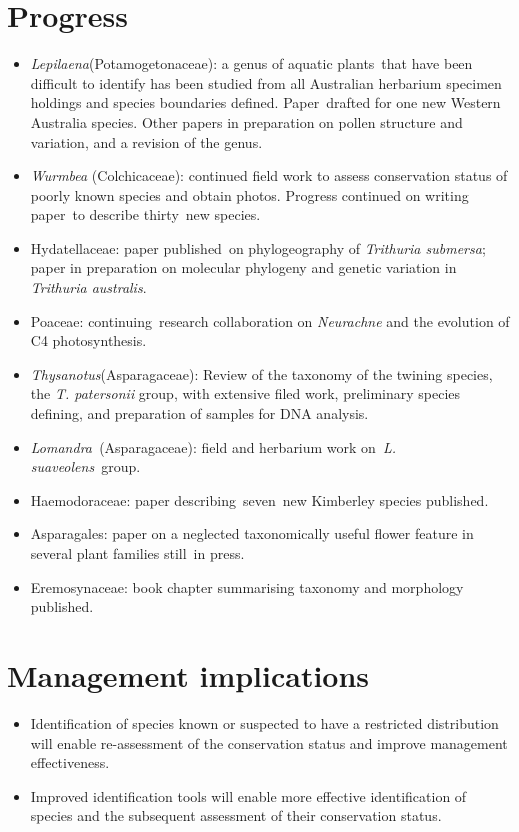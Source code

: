\documentclass[version=last,
    paper=a4, %
    10pt, %
    usenames,
    dvipsnames,
    oneside, %
    headings=openany, %
    DIV=15 %
]{scrbook}
\begin{document}
\section*{Progress}
\begin{itemize}
\itemsep1pt\parskip0pt
\item
  \emph{Lepilaena}(Potamogetonaceae): a genus of aquatic plants~that
  have been difficult to identify has been studied from all Australian
  herbarium specimen holdings and species boundaries defined.
  Paper~drafted for one new Western Australia species. Other papers in
  preparation on pollen structure and variation, and a revision of the
  genus.
\item
  \emph{Wurmbea} (Colchicaceae): continued field work to assess
  conservation status of poorly known species and obtain photos.
  Progress continued on writing paper~to describe thirty~new species.
\item
  Hydatellaceae: paper published~on phylogeography of \emph{Trithuria
  submersa}; paper in preparation on molecular phylogeny and genetic
  variation in \emph{Trithuria australis}.
\item
  Poaceae: continuing~research collaboration on \emph{Neurachne} and the
  evolution of C4 photosynthesis.
\item
  \emph{Thysanotus}(Asparagaceae): Review of the taxonomy of the twining
  species, the \emph{T. patersonii} group, with extensive filed work,
  preliminary species defining, and preparation of samples for DNA
  analysis.
\item
  \emph{Lomandra\emph{~}}(Asparagaceae): field and herbarium work
  on~\emph{L. suaveolens~}group.~
\item
  Haemodoraceae: paper describing~seven~new Kimberley species published.
\item
  Asparagales: paper on a neglected taxonomically useful flower feature
  in several plant families still~in press.
\item
  Eremosynaceae: book chapter summarising taxonomy and morphology
  published.
\end{itemize}



\section*{Management implications}
\begin{itemize}
\itemsep1pt\parskip0pt
\item
  Identification of species known or suspected to have a restricted
  distribution will enable re-assessment of the conservation status and
  improve management effectiveness.
\item
  Improved identification tools will enable more effective
  identification of species and the subsequent assessment of their
  conservation status.
\end{itemize}
\end{document}
